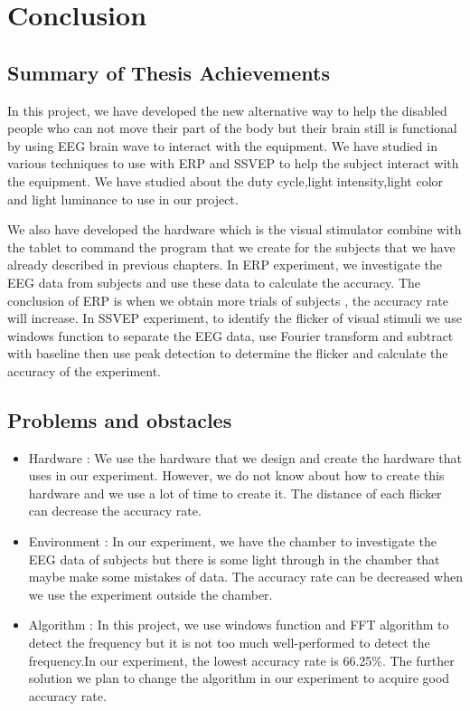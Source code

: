 \chapter{Conclusion}

\label{ch:conclusions}

\section{Summary of Thesis Achievements}

\hspace{1.5cm}
In this project, we have developed the new alternative way to help the disabled people who can not move their part of the body but their brain still is functional by using EEG brain wave to interact with the equipment. We have studied in various techniques to use with ERP and SSVEP to help the subject interact with the equipment. We have studied about the duty cycle,light intensity,light color and light luminance to use in our project.\par
We also have developed the hardware which is the visual stimulator combine with the tablet to command the program that we create for the subjects that we have already described in previous chapters. In ERP experiment, we investigate the EEG data from subjects and use these data to calculate the accuracy. The conclusion of ERP is when we obtain more trials of subjects , the accuracy rate will increase. In SSVEP experiment, to identify the flicker of visual stimuli we use windows function to separate the EEG data, use Fourier transform and subtract with baseline then use peak detection to determine the flicker and calculate the accuracy of the experiment.

\newpage
\section{Problems and obstacles}
\begin{itemize}
\item Hardware : We use the hardware that we design and create the hardware that uses in our experiment. However, we do not know about how to create this hardware and we use a lot of time to create it. The distance of each flicker can decrease the accuracy rate.

\item Environment : In our experiment, we have the chamber to investigate the EEG data of subjects but there is some light through in the chamber that maybe make some mistakes of data. The accuracy rate can be decreased when we use the experiment outside the chamber.

\item Algorithm : In this project, we use windows function and FFT algorithm to detect the frequency but it is not too much well-performed to detect the frequency.In our experiment, the lowest accuracy rate is 66.25\%. The further solution we plan to change the algorithm in our experiment to acquire good accuracy rate.
\end{itemize}

